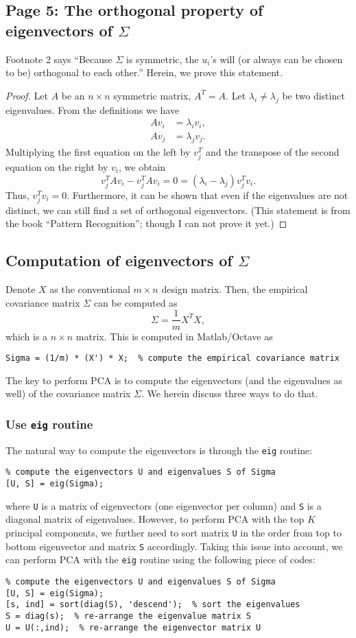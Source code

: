 \documentclass{article}
\begin{document}
\subsection{Page 5: The orthogonal property of eigenvectors of $\Sigma$}
Footnote 2 says ``Because $\Sigma$ is symmetric, the $u_i$'s will (or always can be chosen to be) orthogonal to each other.'' Herein, we prove this statement.
\begin{proof}
Let $A$ be an $n\times n$ symmetric matrix, $A^T=A$. Let $\lambda_i\neq \lambda_j$ be two distinct eigenvalues. From the definitions we have
\[
\begin{split}
A v_i &= \lambda_i v_i,\\
A v_j &= \lambda_j v_j.
\end{split}
\]
Multiplying the first equation on the left by $v_j^T$ and the transpose of the second equation on the right by $v_i$, we obtain
\[
v_j^TAv_i-v_j^TAv_i=0=(\lambda_i-\lambda_j)v_j^Tv_i.
\]
Thus, $v_j^Tv_i=0$. Furthermore, it can be shown that even if the eigenvalues are not distinct, we can still find a set of orthogonal eigenvectors. (This statement is from the book ``Pattern Recognition''; though I can not prove it yet.)
\end{proof}

\subsection{Computation of eigenvectors of $\Sigma$}
Denote $X$ as the conventional $m\times n$ design matrix. Then, the empirical covariance matrix $\Sigma$ can be computed as
\[
\Sigma = \frac{1}{m} X^TX,
\]
which is a $n\times n$ matrix. This is computed in Matlab/Octave as
\begin{verbatim}
Sigma = (1/m) * (X') * X;  % compute the empirical covariance matrix
\end{verbatim}
The key to perform PCA is to compute the eigenvectors (and the eigenvalues as well) of the covariance matrix $\Sigma$. We herein discuss three ways to do that.

\subsubsection{Use \texttt{eig} routine}
The natural way to compute the eigenvectors is through the \texttt{eig} routine:
\begin{verbatim}
% compute the eigenvectors U and eigenvalues S of Sigma
[U, S] = eig(Sigma);
\end{verbatim}
where \texttt{U} is a matrix of eigenvectors (one eigenvector per column) and \texttt{S} is a diagonal matrix of eigenvalues. However, to perform PCA with the top $K$ principal components, we further need to sort matrix \texttt{U} in the order from top to bottom eigenvector and matrix \texttt{S} accordingly. Taking this issue into account, we can perform PCA with the \texttt{eig} routine using the following piece of codes:
\begin{verbatim}
% compute the eigenvectors U and eigenvalues S of Sigma
[U, S] = eig(Sigma);
[s, ind] = sort(diag(S), 'descend');  % sort the eigenvalues
S = diag(s);  % re-arrange the eigenvalue matrix S
U = U(:,ind);  % re-arrange the eigenvector matrix U
\end{verbatim}
\end{document}
